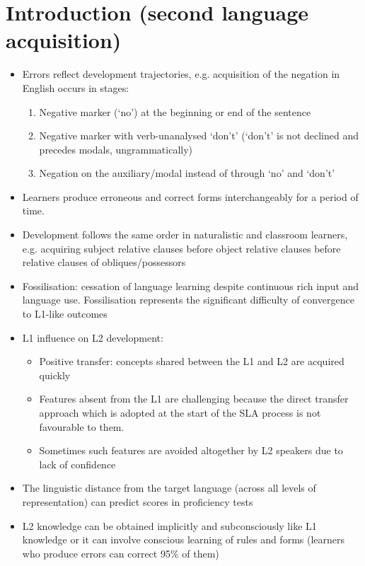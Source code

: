 \documentclass{article}
\begin{document}
\section{Introduction (second language acquisition)}
\begin{itemize}
    \item Errors reflect development trajectories, e.g. acquisition of the negation in English occurs in stages:
    \begin{enumerate}
        \item Negative marker (`no') at the beginning or end of the sentence
        \item Negative marker with verb-unanalysed `don't' (`don't' is not declined and precedes modals, ungrammatically)
        \item Negation on the auxiliary/modal instead of through `no' and `don't'
    \end{enumerate}
    \item Learners produce erroneous and correct forms interchangeably for a period of time.
    \item Development follows the same order in naturalistic and classroom learners, e.g. acquiring subject relative clauses before object relative clauses before relative clauses of obliques/possessors
    \item Fossilisation: cessation of language learning despite continuous rich input and language use. Fossilisation represents the significant difficulty of convergence to L1-like outcomes
    \item L1 influence on L2 development:
    \begin{itemize}
        \item Positive transfer: concepts shared between the L1 and L2 are acquired quickly
        \item Features absent from the L1 are challenging because the direct transfer approach which is adopted at the start of the SLA process is not favourable to them.
        \item Sometimes such features are avoided altogether by L2 speakers due to lack of confidence 
    \end{itemize}
    \item The linguistic distance from the target language (across all levels of representation) can predict scores in proficiency tests
    \item L2 knowledge can be obtained implicitly and subconsciously like L1 knowledge or it can involve conscious learning of rules and forms (learners who produce errors can correct 95\% of them)

\end{itemize}
\end{document}
